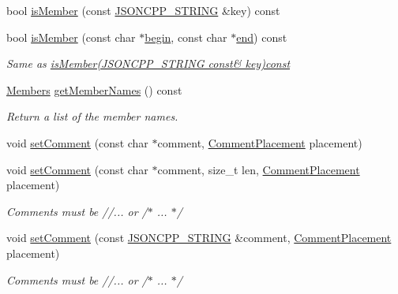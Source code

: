 \begin{DoxyCompactItemize}
bool \hyperlink{class_json_1_1_value_a0c2cd838217b23ee6bde8135de1b30d9}{is\+Member} (const \hyperlink{json_8h_a1e723f95759de062585bc4a8fd3fa4be}{J\+S\+O\+N\+C\+P\+P\+\_\+\+S\+T\+R\+I\+NG} \&key) const
\item 
bool \hyperlink{class_json_1_1_value_a2007e1e51f21f44ecf1f13e4a1c567b9}{is\+Member} (const char $\ast$\hyperlink{class_json_1_1_value_a015459a3950c198d63a2d3be8f5ae296}{begin}, const char $\ast$\hyperlink{class_json_1_1_value_a3e443cd0ef24f7e028b175e47ee045e0}{end}) const
\begin{DoxyCompactList}\small\item\em Same as \hyperlink{class_json_1_1_value_a0c2cd838217b23ee6bde8135de1b30d9}{is\+Member(\+J\+S\+O\+N\+C\+P\+P\+\_\+\+S\+T\+R\+I\+N\+G const\& key)const} \end{DoxyCompactList}\item 
\hyperlink{class_json_1_1_value_a9ae9069983fc38f1928d76f9c79ac64d}{Members} \hyperlink{class_json_1_1_value_a79d7725dce6260317333e69022367ac9}{get\+Member\+Names} () const
\begin{DoxyCompactList}\small\item\em Return a list of the member names. \end{DoxyCompactList}\item 
void \hyperlink{class_json_1_1_value_a29f3a30f7e5d3af6f38d57999bf5b480}{set\+Comment} (const char $\ast$comment, \hyperlink{namespace_json_a4fc417c23905b2ae9e2c47d197a45351}{Comment\+Placement} placement)
\item 
void \hyperlink{class_json_1_1_value_a2900152a2887b410a9ddabe278b9d492}{set\+Comment} (const char $\ast$comment, size\+\_\+t len, \hyperlink{namespace_json_a4fc417c23905b2ae9e2c47d197a45351}{Comment\+Placement} placement)
\begin{DoxyCompactList}\small\item\em Comments must be //... or /$\ast$ ... $\ast$/ \end{DoxyCompactList}\item 
void \hyperlink{class_json_1_1_value_a2c5d13a5f45eb77e912008778e65b27f}{set\+Comment} (const \hyperlink{json_8h_a1e723f95759de062585bc4a8fd3fa4be}{J\+S\+O\+N\+C\+P\+P\+\_\+\+S\+T\+R\+I\+NG} \&comment, \hyperlink{namespace_json_a4fc417c23905b2ae9e2c47d197a45351}{Comment\+Placement} placement)
\begin{DoxyCompactList}\small\item\em Comments must be //... or /$\ast$ ... $\ast$/ \end{DoxyCompactList}\item 

\end{DoxyCompactItemize}
